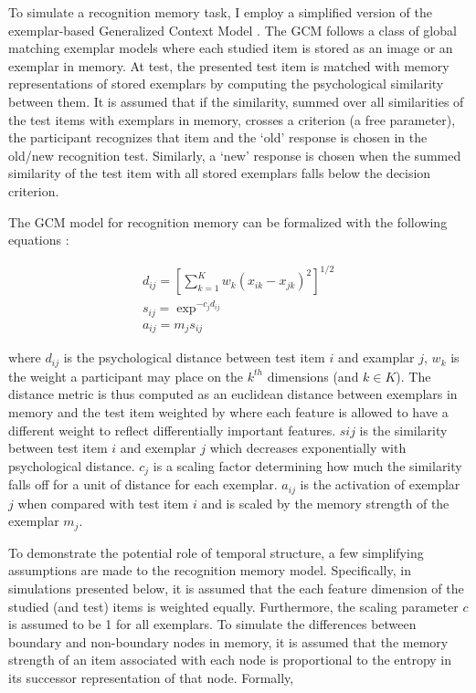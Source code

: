To simulate a recognition memory task, I employ a simplified version of the exemplar-based Generalized Context Model \cite{nosofsky2011generalized,nosofsky1986attention, nosofsky2011short}. The GCM follows a class of global matching exemplar models where each studied item is stored as an image or an exemplar in memory. At test, the presented test item is matched with memory representations of stored exemplars by computing the psychological similarity between them. It is assumed that if the similarity, summed over all similarities of the test items with exemplars in memory, crosses a criterion (a free parameter), the participant recognizes that item and the `old' response is chosen in the old/new recognition test. Similarly, a `new' response is chosen when the summed similarity of the test item with all stored exemplars falls below the decision criterion. 

The GCM model for recognition memory can be formalized with the following equations \cite{nosofsky2011short}:

\begin{equation}
    \begin{aligned}
        d_{ij} = [\sum\limits_{k = 1}^K w_k(x_{ik} - x_{jk})^2]^{1/2} \\
        s_{ij} = \exp^{-c_jd_{ij}} \\
        a_{ij} = m_js_{ij}
    \end{aligned}
\end{equation}    

where $d_{ij}$ is the psychological distance between test item $i$ and examplar $j$, $w_k$ is the weight a participant may place on the $k^{th}$ dimensions (and $k \in K$). The distance metric is thus computed as an euclidean distance between exemplars in memory and the test item weighted by where each feature is allowed to have a different weight to reflect differentially important features. $s{ij}$ is the similarity between test item $i$ and exemplar $j$ which decreases exponentially with psychological distance. $c_j$ is a scaling factor determining how much the similarity falls off for a unit of distance for each exemplar. $a_{ij}$ is the activation of exemplar $j$ when compared with test item $i$ and is scaled by the memory strength of the exemplar $m_j$. 

To demonstrate the potential role of temporal structure, a few simplifying assumptions are  made to the recognition memory model. Specifically, in simulations presented below, it is assumed that the each feature dimension of the studied (and test) items is weighted equally. Furthermore, the scaling parameter $c$ is assumed to be 1 for all exemplars. To simulate the differences between boundary and non-boundary nodes in memory, it is assumed that the memory strength of an item associated with each node is proportional to the entropy in its successor representation of that node. Formally, 

